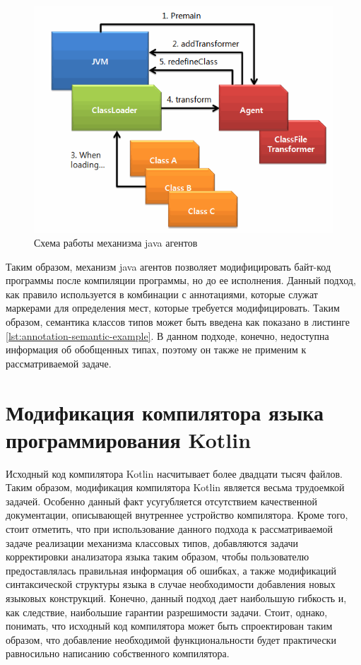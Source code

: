\begin{figure}[htbp]
    \centering
    \includegraphics[width=\textwidth]{resources/05/03_bytecode_manipulation_scheme.png}
    \caption{Схема работы механизма java агентов}
    \label{fig04:java-agent-scheme}
\end{figure}

Таким образом, механизм java агентов позволяет модифицировать байт-код программы после компиляции программы, но до ее исполнения. Данный подход, как правило используется в комбинации с аннотациями, которые служат маркерами для определения мест, которые требуется модифицировать. Таким образом, семантика классов типов может быть введена как показано в листинге \ref{lst:annotation-semantic-example}. В данном подходе, конечно, недоступна информация об обобщенных типах, поэтому он также не применим к рассматриваемой задаче. 

\section{Модификация компилятора языка программирования Kotlin}

Исходный код компилятора Kotlin насчитывает более двадцати тысяч файлов. Таким образом, модификация компилятора Kotlin является весьма трудоемкой задачей. Особенно данный факт усугубляется отсутствием качественной документации, описывающей внутреннее устройство компилятора. Кроме того, стоит отметить, что при использование данного подхода к рассматриваемой задаче реализации механизма классовых типов, добавляются задачи корректировки анализатора языка таким образом, чтобы пользователю предоставлялась правильная информация об ошибках, а также модификаций синтаксической структуры языка в случае необходимости добавления новых языковых конструкций. Конечно, данный подход дает наибольшую гибкость и, как следствие, наибольшие гарантии разрешимости задачи. Стоит, однако, понимать, что исходный код компилятора может быть спроектирован таким образом, что добавление необходимой функциональности будет практически равносильно написанию собственного компилятора.

